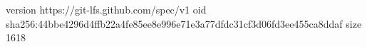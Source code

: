 version https://git-lfs.github.com/spec/v1
oid sha256:44bbe4296d4ffb22a4fe85ee8e996e71e3a77dfdc31cf3d06fd3ee455ca8ddaf
size 1618
